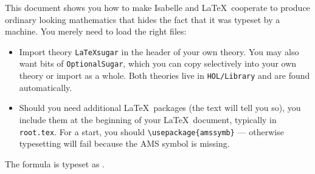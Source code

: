 \begin{isabellebody}
\begin{isamarkuptext}
This document shows you how to make Isabelle and \LaTeX\ cooperate to
produce ordinary looking mathematics that hides the fact that it was
typeset by a machine. You merely need to load the right files:
\begin{itemize}
\item Import theory \texttt{LaTeXsugar} in the header of your own
theory.  You may also want bits of \texttt{OptionalSugar}, which you can
copy selectively into your own theory or import as a whole.  Both
theories live in \texttt{HOL/Library} and are found automatically.

\item Should you need additional \LaTeX\ packages (the text will tell
you so), you include them at the beginning of your \LaTeX\ document,
typically in \texttt{root.tex}. For a start, you should
\verb!\usepackage{amssymb}! --- otherwise typesetting
 will fail because the AMS symbol
 is missing.
\end{itemize}%
\end{isamarkuptext}%
\isamarkuptrue%
%
\isamarkuptrue%
%
\isamarkuptrue%
%
\begin{isamarkuptext}%
The formula  is typeset as .


\end{isamarkuptext}
\end{isabellebody}
